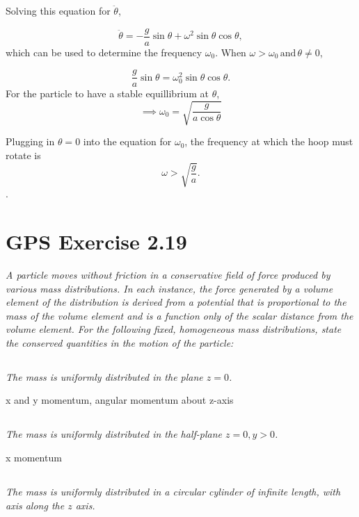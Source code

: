 \documentclass{article}
\begin{document}
Solving this equation for $\ddot\theta$, 

\begin{equation*}
    \ddot{\theta}=-\frac{g}{a} \sin \theta+\omega^{2} \sin \theta \cos \theta, 
\end{equation*}
which can be used to determine the frequency $\omega_{0}$. When $\omega > \omega_{0}\, \text{and}\, \theta \neq 0$, 

\begin{equation*}
    \frac{g}{a} \sin \theta=\omega_{0}^{2} \sin \theta \cos \theta.
\end{equation*}
For the particle to have a stable equillibrium at $\theta$, 
\begin{equation*}
    \implies \omega_{0}=\sqrt{\frac{g}{a \cos \theta}}
\end{equation*}

Plugging in $\theta = 0$ into the equation for $\omega_0$, the frequency at which the hoop must rotate is
$$
\boxed{
\omega > \sqrt{\frac{g}{a}}.
}
 $$.
\newpage

\section{GPS Exercise 2.19}
\textit{A particle moves without friction in a conservative field of force produced by various mass distributions. In each instance, the force generated by a volume element of the distribution is derived from a potential that is proportional to the mass of the volume element and is a function only of the scalar distance from the volume element. For the following fixed, homogeneous mass distributions, state the conserved quantities in the motion of the particle:}

\subsection{}
\textit{The mass is uniformly distributed in the plane $z=0$.}

x and y momentum, angular momentum about z-axis

\subsection{}
\textit{The mass is uniformly distributed in the half-plane $z=0, y>0$.}

x momentum

\subsection{}
\textit{The mass is uniformly distributed in a circular cylinder of infinite length, with axis along the $z$ axis.}
\end{document}
